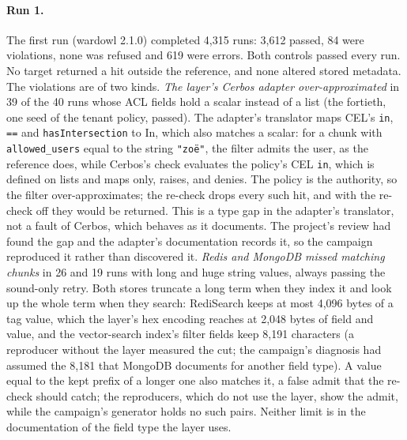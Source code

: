 \paragraph{Run 1.}
The first run (wardowl 2.1.0) completed 4,315 runs: 3,612 passed, 84 were violations, none was
refused and 619 were errors. Both controls passed every run. No target returned a hit outside the
reference, and none altered stored metadata. The violations are of two kinds. \emph{The layer's
Cerbos adapter over-approximated} in 39 of the 40 runs whose ACL fields hold a scalar instead of a
list (the fortieth, one seed of the tenant policy, passed). The adapter's translator maps CEL's
\texttt{in}, \texttt{==} and \texttt{hasIntersection} to $\mathrm{In}$, which also matches a scalar:
for a chunk with \texttt{allowed\_users} equal to the string \texttt{"zo\"e"}, the filter admits the
user, as the reference does, while Cerbos's check evaluates the policy's CEL \texttt{in}, which is
defined on lists and maps only, raises, and denies. The policy is the authority, so the filter
over-approximates; the re-check drops every such hit, and with the re-check off they would be
returned. This is a type gap in the adapter's translator, not a fault of Cerbos, which behaves as it
documents. The project's review had found the gap and the adapter's documentation records it, so the
campaign reproduced it rather than discovered it. \emph{Redis and MongoDB missed matching chunks} in
26 and 19 runs with long and huge
string values, always passing the sound-only retry. Both stores truncate a long term when they index
it and look up the whole term when they search: RediSearch keeps at most 4,096 bytes of a tag value,
which the layer's hex encoding reaches at 2,048 bytes of field and value, and the vector-search
index's filter fields keep 8,191 characters (a reproducer without the layer measured the cut; the
campaign's diagnosis had assumed the 8,181 that MongoDB documents for another field type). A value
equal to the kept prefix of a longer one also matches it, a false admit that the re-check should catch;
the reproducers, which do not use the layer, show the admit, while the campaign's generator holds no such pairs. Neither limit is in
the documentation of the field type the layer uses.

